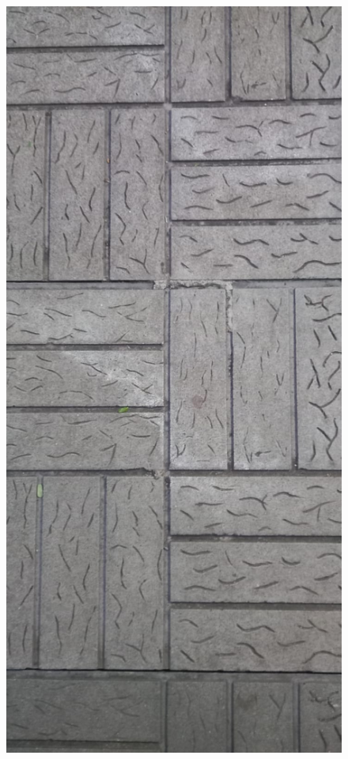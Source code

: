 \documentclass{beamer}
\begin{document}
\begin{frame}
\begin{figure}
        \includegraphics[height=0.5\textheight]{corridor2}

\end{figure}
\end{frame}
\end{document}
